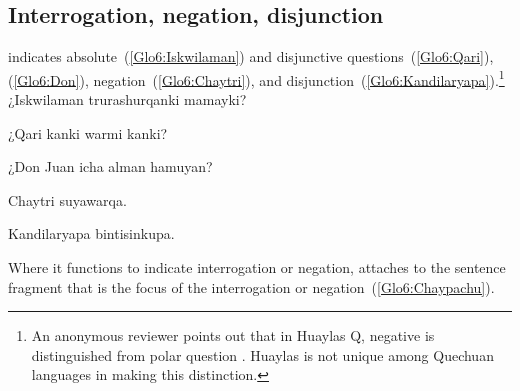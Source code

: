 \subsection{Interrogation, negation, disjunction }\label{ssec:innedi}
 indicates absolute~(\ref{Glo6:Iskwilaman}) and disjunctive questions~(\ref{Glo6:Qari}), (\ref{Glo6:Don}), negation~(\ref{Glo6:Chaytri}), and disjunction~(\ref{Glo6:Kandilaryapa}).\footnote{An anonymous reviewer points out that in Huaylas Q, negative  is distinguished from polar question . Huaylas is not unique among Quechuan languages in making this distinction.}\\

%
{¿Iskwilaman trurashurqanki mamayki?}%
{}%
{}{}%

%
{¿Qari kanki warmi kanki?}%
{}%
{}{}%

%
{¿Don Juan icha alman hamuyan?}%
{}%
{}{}%

%
{Chaytri  suyawarqa.}%
{}%
{}{}%

%
{Kandilaryapa bintisinkupa.}%
{}%
{}{}%

\noindent
Where it functions to indicate interrogation or negation,  attaches to the sentence fragment that is the focus of the interrogation or negation~(\ref{Glo6:Chaypachu}).\\

